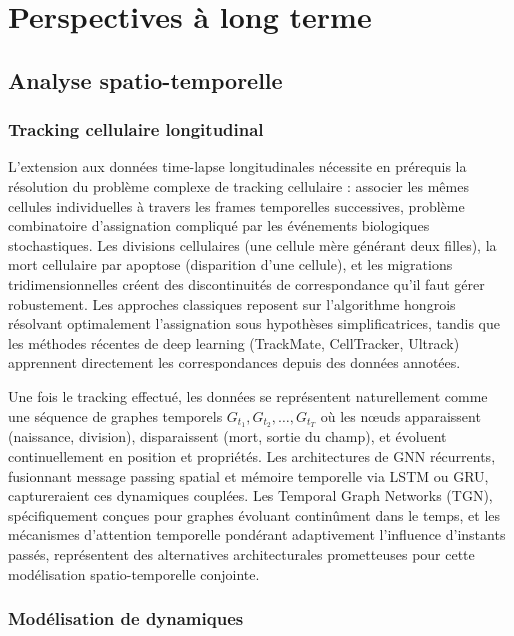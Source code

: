 \section{Perspectives à long terme}

\subsection{Analyse spatio-temporelle}

\subsubsection{Tracking cellulaire longitudinal}

L'extension aux données time-lapse longitudinales nécessite en prérequis la résolution du problème complexe de tracking cellulaire : associer les mêmes cellules individuelles à travers les frames temporelles successives, problème combinatoire d'assignation compliqué par les événements biologiques stochastiques. Les divisions cellulaires (une cellule mère générant deux filles), la mort cellulaire par apoptose (disparition d'une cellule), et les migrations tridimensionnelles créent des discontinuités de correspondance qu'il faut gérer robustement. Les approches classiques reposent sur l'algorithme hongrois résolvant optimalement l'assignation sous hypothèses simplificatrices, tandis que les méthodes récentes de deep learning (TrackMate, CellTracker, Ultrack) apprennent directement les correspondances depuis des données annotées.

Une fois le tracking effectué, les données se représentent naturellement comme une séquence de graphes temporels $G_{t_1}, G_{t_2}, \ldots, G_{t_T}$ où les nœuds apparaissent (naissance, division), disparaissent (mort, sortie du champ), et évoluent continuellement en position et propriétés. Les architectures de GNN récurrents, fusionnant message passing spatial et mémoire temporelle via LSTM ou GRU, captureraient ces dynamiques couplées. Les Temporal Graph Networks (TGN), spécifiquement conçues pour graphes évoluant continûment dans le temps, et les mécanismes d'attention temporelle pondérant adaptivement l'influence d'instants passés, représentent des alternatives architecturales prometteuses pour cette modélisation spatio-temporelle conjointe.

\subsubsection{Modélisation de dynamiques}

